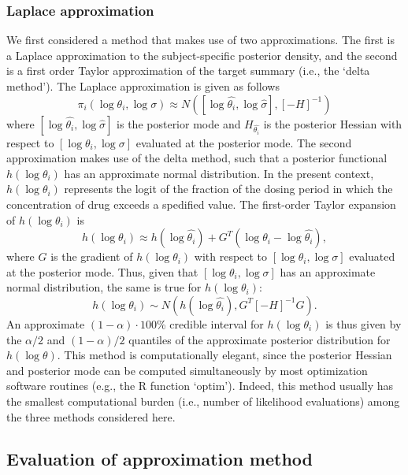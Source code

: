 \documentclass{article}\usepackage[]{graphicx}\usepackage[]{color}
\begin{document}
\subsubsection{Laplace approximation}
We first considered a method that makes use of two approximations. The first is a Laplace approximation to the subject-specific posterior density, and the second is a first order Taylor approximation of the target summary (i.e., the `delta method'). The Laplace approximation is given as follows
$$\pi_i(\log \theta_i, \log \sigma) \approx N([\log \hat{\theta_i},\log \hat{\sigma}], [-H]^{-1})$$
\noindent where $[\log \hat{\theta_i},\log \hat{\sigma}]$ is the posterior mode and $H_{\hat{\theta_i}}$ is the posterior Hessian with respect to $[\log \theta_i, \log \sigma]$ evaluated at the posterior mode. The second approximation makes use of the delta method, such that a posterior functional $h(\log \theta_i)$ has an approximate normal distribution. In the present context, $h(\log \theta_i)$ represents the logit of the fraction of the dosing period in which the concentration of drug exceeds a spedified value. The first-order Taylor expansion of $h(\log \theta_i)$ is
\begin{displaymath}
h(\log \theta_i) \approx  h(\log \hat{\theta_i}) + G^T(\log \theta_i - \log \hat{\theta_i}),
\end{displaymath}
\noindent where $G$ is the gradient of $h(\log \theta_i)$ with respect to $[\log \theta_i, \log \sigma]$ evaluated at the posterior mode. Thus, given that $[\log \theta_i, \log \sigma]$ has an approximate normal distribution, the same is true for $h(\log \theta_i)$:
\begin{displaymath}
h(\log \theta_i) \sim N(h(\log \hat{\theta_i}), G^T[-H]^{-1}G).
\end{displaymath}
\noindent An approximate $(1-\alpha)\cdot 100$\% credible interval for $h(\log \theta_i)$ is thus given by the $\alpha/2$ and $(1-\alpha)/2$ quantiles of the approximate posterior distribution for $h(\log \theta)$. This method is computationally elegant, since the posterior Hessian and posterior mode can be computed simultaneously by most optimization software routines (e.g., the R function `optim'). Indeed, this method usually has the smallest computational burden (i.e., number of likelihood evaluations) among the three methods considered here.

\subsection{Evaluation of approximation method}
\end{document}
